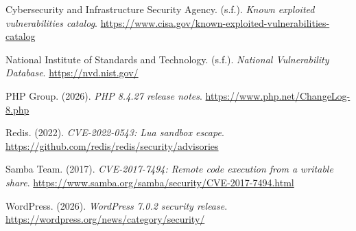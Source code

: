 \documentclass[11pt,a4paper]{article}
\begin{document}
Cybersecurity and Infrastructure Security Agency. (s.f.). \textit{Known exploited vulnerabilities catalog}. \url{https://www.cisa.gov/known-exploited-vulnerabilities-catalog}

National Institute of Standards and Technology. (s.f.). \textit{National Vulnerability Database}. \url{https://nvd.nist.gov/}

PHP Group. (2026). \textit{PHP 8.4.27 release notes}. \url{https://www.php.net/ChangeLog-8.php}

Redis. (2022). \textit{CVE-2022-0543: Lua sandbox escape}. \url{https://github.com/redis/redis/security/advisories}

Samba Team. (2017). \textit{CVE-2017-7494: Remote code execution from a writable share}. \url{https://www.samba.org/samba/security/CVE-2017-7494.html}

WordPress. (2026). \textit{WordPress 7.0.2 security release}. \url{https://wordpress.org/news/category/security/}

\endgroup
\end{document}
